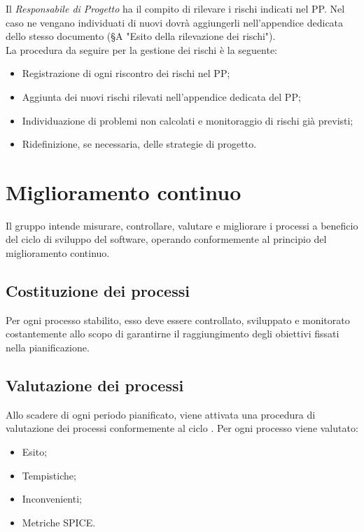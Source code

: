 \documentclass[../NormediProgetto.tex]{subfiles}
\begin{document}
	Il \textit{Responsabile di Progetto} ha il compito di rilevare i rischi indicati nel PP. Nel caso ne vengano individuati di nuovi dovrà aggiungerli nell'appendice dedicata dello stesso documento (§A "Esito della rilevazione dei rischi"). 
	\\ \noindent La procedura da seguire per la gestione dei rischi è la seguente:
	\begin{itemize}
		\item Registrazione di ogni riscontro dei rischi nel PP;
		\item Aggiunta dei nuovi rischi rilevati nell'appendice dedicata del PP;
		\item Individuazione di problemi non calcolati e monitoraggio di rischi già previsti;
		\item Ridefinizione, se necessaria, delle strategie di progetto.
	\end{itemize}
	
	\section{Miglioramento continuo}
	Il gruppo intende misurare, controllare, valutare e migliorare i processi a beneficio del ciclo di sviluppo del software, operando conformemente al principio del miglioramento continuo.
	
	\subsection{Costituzione dei processi}
	Per ogni processo stabilito, esso deve essere controllato, sviluppato e monitorato costantemente allo scopo di
	garantirne il raggiungimento degli obiettivi fissati nella pianificazione.
	
	\subsection{Valutazione dei processi}
	Allo scadere di ogni periodo pianificato, viene attivata una procedura di valutazione dei processi conformemente al ciclo . Per ogni processo viene valutato:
	\begin{itemize}
		\item Esito;
		\item Tempistiche;
		\item Inconvenienti;
		\item Metriche SPICE.
	\end{itemize}
	
\end{document}
